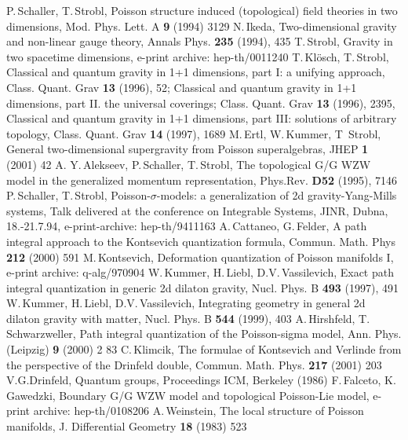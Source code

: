 \documentclass[a4paper,twoside,11pt]{article}
\numberwithin{equation}{section}
\begin{document}
\begin{thebibliography}{235}
%
%
 P.\,Schaller, T.\,Strobl, Poisson structure induced (topological) field theories in two dimensions, Mod. Phys. Lett. A {\bf 9} (1994) 3129
%
  N.\,Ikeda, Two-dimensional gravity and non-linear gauge theory, Annals Phys. {\bf 235} (1994), 435
%
 T.\,Strobl, Gravity in two spacetime dimensions, e-print archive: hep-th/0011240
%
 T.\,Kl\"osch, T.\,Strobl,  Classical and quantum gravity in 1+1 dimensions, part I: a unifying approach, Class. Quant. Grav {\bf 13} (1996), 52; 
Classical and quantum gravity in 1+1 dimensions, part II. the universal coverings; Class. Quant. Grav {\bf 13} (1996), 2395, Classical and quantum gravity in 
1+1 dimensions, part III: solutions of arbitrary topology, Class. Quant. Grav {\bf 14} (1997), 1689
%
 M.\,Ertl, W.\,Kummer, T\, Strobl, General two-dimensional supergravity from Poisson superalgebras, JHEP {\bf 1} (2001) 42
%
 A. Y.\,Alekseev, P.\,Schaller, T.\,Strobl, The topological G/G WZW model in the generalized momentum representation, Phys.Rev. {\bf D52} (1995), 7146 
%
  P.\,Schaller, T.\,Strobl, Poisson-$\sigma$-models: a generalization of 2d gravity-Yang-Mills systems, Talk delivered at 
the conference on Integrable Systems, JINR, Dubna, 18.-21.7.94, e-print-archive: hep-th/9411163
 A.\,Cattaneo, G.\,Felder, A path integral approach to the Kontsevich quantization formula, Commun. Math. Phys {\bf 212} (2000) 591
%
 M.\,Kontsevich, Deformation quantization of Poisson manifolds I, e-print archive: q-alg/970904
%
 W.\,Kummer, H.\,Liebl, D.V.\,Vassilevich, Exact path integral quantization in generic 2d dilaton gravity, Nucl. Phys. B {\bf 493} (1997), 491
%
 W.\,Kummer, H.\,Liebl, D.V.\,Vassilevich, Integrating geometry in general 2d dilaton gravity with matter,  Nucl. Phys. B {\bf 544} (1999), 403
%
 A.\,Hirshfeld, T.\,Schwarzweller, Path integral quantization of the Poisson-sigma model, Ann. Phys. (Leipzig) {\bf 9} (2000) 2 83
%
 C.\,Klimcik, The formulae of Kontsevich and Verlinde from the perspective of the Drinfeld double, Commun. Math. Phys. {\bf 217} (2001) 203
%
 V.G.\;Drinfeld, Quantum groups, Proceedings ICM, Berkeley (1986)
%
 F.\,Falceto, K.\,Gawedzki,  Boundary G/G WZW model and topological Poisson-Lie model, e-print archive:  hep-th/0108206
%
 A.\,Weinstein,  The local structure of Poisson manifolds, J. Differential Geometry {\bf 18} (1983) 523 
%

\end{thebibliography}
\end{document}
